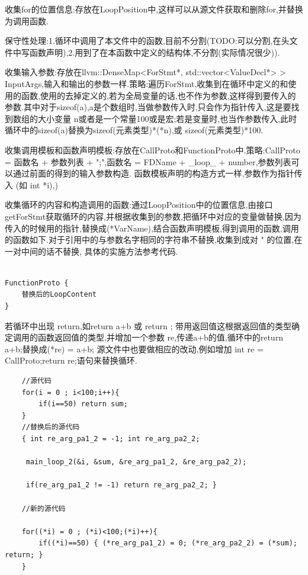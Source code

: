 \par{收集for的位置信息:存放在LoopPosition中,这样可以从源文件获取和删除for,并替换为调用函数.}

\par{保守性处理:1.循环中调用了本文件中的函数,目前不分割(TODO:可以分割,在头文件中写函数声明),2.用到了在本函数中定义的结构体,不分割(实际情况很少)).}

\par{收集输入参数:存放在llvm::DenseMap<ForStmt*, std::vector<ValueDecl*> > InputArgs,输入和输出的参数一样.策略:遍历ForStmt,收集到在循环中定义的和使用的函数,使用的去掉定义的,若为全局变量的话,也不作为参数,这样得到要传入的参数.其中对于sizeof(a),a是个数组时,当做参数传入时,只会作为指针传入,这是要找到数组的大小变量 n或者是一个常量100或是宏;若是变量时,也当作参数传入,此时循环中的sizeof(a)替换为sizeof(元素类型)*(*n),或 sizeof(元素类型)*100.}


\par{收集调用模板和函数声明模板:存放在CallProto和FunctionProto中.策略:CallProto = 函数名 + 参数列表 + ";",函数名 = FDName + \_loop\_ + number,参数列表可以通过前面的得到的输入参数构造. 函数模板声明的构造方式一样,参数作为指针传入 (如 int *i),)  }

\par{收集循环的内容和构造调用的函数:通过LoopPosition中的位置信息,由接口getForStmt获取循环的内容,并根据收集到的参数,把循环中对应的变量做替换,因为传入的时候用的指针,替换成(*VarName),结合函数声明模板,得到调用的函数,调用的函数如下.对于引用中的与参数名字相同的字符串不替换,收集到成对 " 的位置,在一对中间的话不替换, 具体的实施方法参考代码.}
\begin{lstlisting}

FunctionProto {
    替换后的LoopContent
}
\end{lstlisting}

\par{若循环中出现 return,如return a+b 或 return ; 带用返回值这根据返回值的类型确定调用的函数返回值的类型,并增加一个参数 re,传递a+b的值,循环中的return a+b;替换成(*re) = a+b; 源文件中也要做相应的改动,例如增加 int re = CallProto;return re;语句来替换循环.  }

\begin{lstlisting}
    //源代码
    for(i = 0 ; i<100;i++){
        if(i==50) return sum;
    }
    //替换后的源代码
    { int re_arg_pa1_2 = -1; int re_arg_pa2_2;
    
     main_loop_2(&i, &sum, &re_arg_pa1_2, &re_arg_pa2_2);
        
     if(re_arg_pa1_2 != -1) return re_arg_pa2_2; }

    //新的源代码

    for((*i) = 0 ; (*i)<100;(*i)++){
        if((*i)==50) { (*re_arg_pa1_2) = 0; (*re_arg_pa2_2) = (*sum); return; }
    }

\end{lstlisting}

